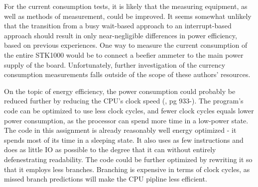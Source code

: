 For the current consumption tests, it is likely that the measuring equipment, as well as methods of measurement, could be improved.
It seems somewhat unlikely that the transition from a busy wait-based approach to an interrupt-based approach should result in only near-negligible differences in power efficiency, based on previous experiences.
One way to measure the current consumption of the entire STK1000 would be to connect a beefier ammeter to the main power supply of the board.
Unfortunately, further investigation of the currency consumption measurements falls outside of the scope of these authors' resources.

On the topic of energy efficiency, the power consumption could probably be reduced further by reducing the CPU's clock speed (\cite{AT32AP7000-prelim}, pg 933-).
The program's code can be optimized to use less clock cycles, and fewer clock cycles equals lower power consumption, as the processor can spend more time in a low-power state.
The code in this assignment is already reasonably well energy optimized - it spends most of its time in a sleeping state. It also uses as few instructions and does as little IO as possible to the degree that it can without entirely defenestrating readability.
The code could be further optimized by rewriting it so that it employs less branches. Branching is expensive in terms of clock cycles, as missed branch predictions will make the CPU pipline less efficient.
